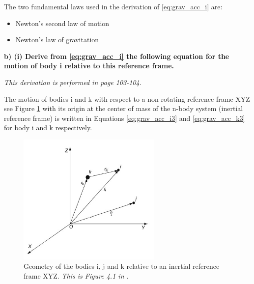 \bigskip

\noindent The two fundamental laws used in the derivation of \ref{eq:grav_acc_i} are:

\begin{itemize}
    \item Newton's second law of motion
    \item Newton's law of gravitation
\end{itemize}

\newpage










\noindent \textbf{b) (i) Derive from \ref{eq:grav_acc_i} the following equation for the motion of body i relative to this reference frame.}

\bigskip

\noindent \textit{This derivation is performed in \cite{wakker} page 103-104.}

\bigskip

\noindent The motion of bodies i and k with respect to a non-rotating reference frame XYZ see Figure \ref{fig:grav_acc_2} with its origin at the center of mass of the n-body system (inertial reference frame) is written in Equations \ref{eq:grav_acc_i3} and \ref{eq:grav_acc_k3} for body i and k respectively.

\begin{figure}[ht]
    \centering
    \includegraphics[width=7cm]{img/grav_acc2.jpg}
    \caption{Geometry of the bodies i, j and k relative to an inertial reference frame XYZ. \textit{This is Figure 4.1 in \cite{wakker}.}}
    \label{fig:grav_acc_2}
\end{figure}

